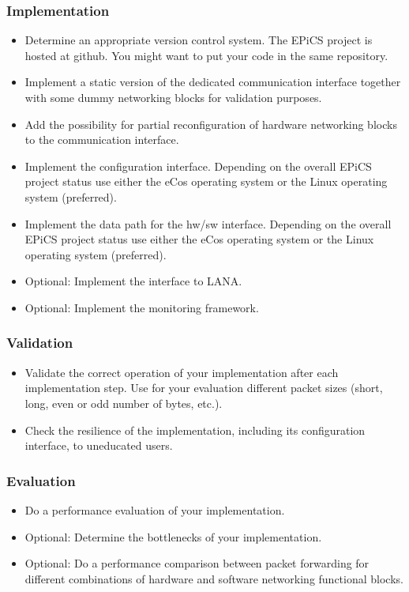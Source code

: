 \subsubsection{Implementation}
\begin{itemize}
        \item Determine an appropriate version control system. The EPiCS project is hosted at github. You might want to put your code in the same repository.
	\item Implement a static version of the dedicated communication interface together with some dummy networking blocks for validation purposes.
        \item Add the possibility for partial reconfiguration of hardware networking blocks to the communication interface.
        \item Implement the configuration interface. 
        Depending on the overall EPiCS project status use either the eCos operating system or the Linux operating system (preferred).
        \item Implement the data path for the hw/sw interface.
        Depending on the overall EPiCS project status use either the eCos operating system or the Linux operating system (preferred).
        \item Optional: Implement the interface to LANA.
        \item Optional: Implement the monitoring framework.
\end{itemize}

\subsubsection{Validation}
\begin{itemize}
	\item Validate the correct operation of your implementation after each implementation step. 
        Use for your evaluation different packet sizes (short, long, even or odd number of bytes, etc.).
	\item Check the resilience of the implementation, including its configuration interface, to uneducated users.
\end{itemize}

\subsubsection{Evaluation}
\begin{itemize}
	\item Do a performance evaluation of your implementation.
        \item Optional: Determine the bottlenecks of your implementation.
        \item Optional: Do a performance comparison between packet forwarding for different combinations of hardware and software networking functional blocks.
\end{itemize}


